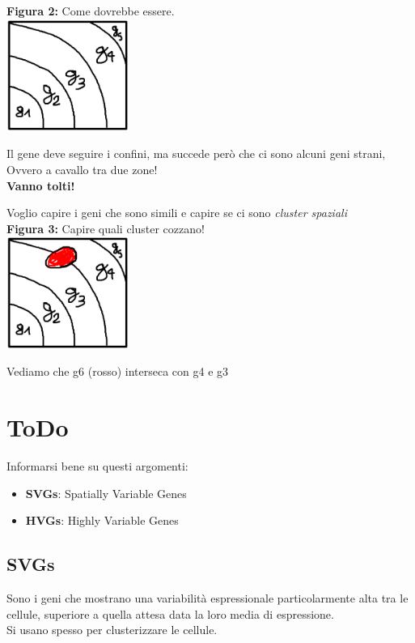 \documentclass{report}
\begin{document}
\newpage
\begin{center}
    \textbf{Figura 2:} Come dovrebbe essere.\\
    \includegraphics[width=0.3\textwidth]{./Pictures/ComeDovrebbeEssere.png}
    
    Il gene deve seguire i confini, ma succede però che ci sono alcuni geni strani, Ovvero a cavallo tra due zone!\\
    \textbf{Vanno tolti!}\\
\end{center}

\begin{center}
    Voglio capire i geni che sono simili e capire se ci sono \textit{cluster spaziali}\\

    \textbf{Figura 3:} Capire quali cluster cozzano!\\
    \includegraphics[width=0.3\textwidth]{./Pictures/Cozzano.png}

    Vediamo che g6 (rosso) interseca con g4 e g3
\end{center}

\section*{ToDo}
Informarsi bene su questi argomenti:
\begin{itemize}
    \item \textbf{SVGs}: Spatially Variable Genes
    \item \textbf{HVGs}: Highly Variable Genes

\end{itemize}

\subsection{SVGs}
Sono i geni che mostrano una variabilità espressionale particolarmente alta tra le cellule, superiore a quella attesa data la loro media di espressione.\\
Si usano spesso per clusterizzare le cellule.
\end{document}
